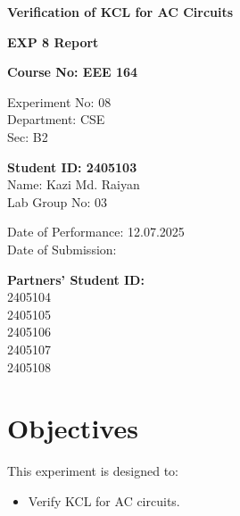 \documentclass[12pt]{article}
\begin{document}
\begin{center}
	\begin{LARGE}
		\textbf{Verification of KCL for AC Circuits}

		\vspace{20pt}
		\textbf{EXP 8 Report}
	\end{LARGE}
\end{center}

\begin{Large}
	\vspace{40pt}
	\textbf{Course No: EEE 164}
\end{Large}

\begin{large}
	\vspace{40pt}
	\begin{minipage}{0.48\textwidth}
		Experiment No: 08\\
		Department: CSE\\
		Sec: B2
	\end{minipage}
	\hfill
	\begin{minipage}{0.48\textwidth}
		\textbf{Student ID: 2405103}\\
		Name: Kazi Md. Raiyan\\
		Lab Group No: 03
	\end{minipage}

	\vfill

	\begin{minipage}[t]{0.48\textwidth}
		Date of Performance: 12.07.2025\\
		Date of Submission: %
	\end{minipage}
	\hfill
	\begin{minipage}[t]{0.48\textwidth}
		\textbf{Partners' Student ID:}\\
		2405104\\
		2405105\\
		2405106\\
		2405107\\
		2405108
	\end{minipage}
    \vspace{80pt}

	\newpage
	\section{Objectives}
	This experiment is designed to:
	\begin{itemize}
		\item Verify KCL for AC circuits.
	\end{itemize}


\end{large}
\end{document}
